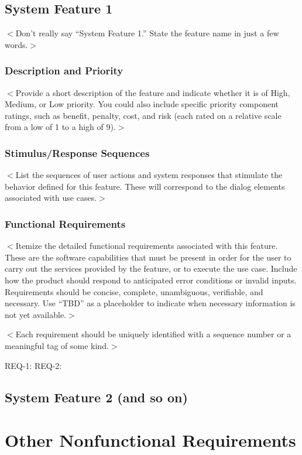 \documentclass{scrreprt}
\begin{document}
\begin{CJK}{UTF8}{bkai}
\section{System Feature 1}
$<$Don’t really say “System Feature 1.” State the feature name in just a few 
words.$>$

\subsection{Description and Priority}
$<$Provide a short description of the feature and indicate whether it is of 
High, Medium, or Low priority. You could also include specific priority 
component ratings, such as benefit, penalty, cost, and risk (each rated on a 
relative scale from a low of 1 to a high of 9).$>$

\subsection{Stimulus/Response Sequences}
$<$List the sequences of user actions and system responses that stimulate the 
behavior defined for this feature. These will correspond to the dialog elements 
associated with use cases.$>$

\subsection{Functional Requirements}
$<$Itemize the detailed functional requirements associated with this feature.  
These are the software capabilities that must be present in order for the user 
to carry out the services provided by the feature, or to execute the use case.  
Include how the product should respond to anticipated error conditions or 
invalid inputs. Requirements should be concise, complete, unambiguous, 
verifiable, and necessary. Use “TBD” as a placeholder to indicate when necessary 
information is not yet available.$>$

$<$Each requirement should be uniquely identified with a sequence number or a 
meaningful tag of some kind.$>$

REQ-1:	REQ-2:

\section{System Feature 2 (and so on)}


\chapter{Other Nonfunctional Requirements}


\end{CJK}
\end{document}

